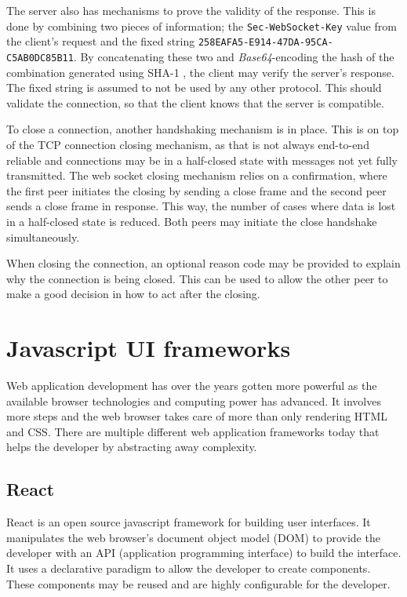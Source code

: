 The server also has mechanisms to prove the validity of the response. This is done by combining two pieces of information; the \texttt{Sec-WebSocket-Key} value from the client's request and the fixed string \texttt{258EAFA5-E914-47DA-95CA-C5AB0DC85B11}. By concatenating these two and \emph{Base64}-encoding \cite{base64} the hash of the combination generated using SHA-1 \cite{RFC3174}, the client may verify the server's response. The fixed string is assumed to not be used by any other protocol. This should validate the connection, so that the client knows that the server is compatible.

To close a connection, another handshaking mechanism is in place. This is on top of the TCP connection closing mechanism, as that is not always end-to-end reliable and connections may be in a half-closed state with messages not yet fully transmitted. \cite[section 4.2.2.13]{RFC1122} The web socket closing mechanism relies on a confirmation, where the first peer initiates the closing by sending a close frame and the second peer sends a close frame in response. This way, the number of cases where data is lost in a half-closed state is reduced. Both peers may initiate the close handshake simultaneously.

When closing the connection, an optional reason code may be provided to explain why the connection is being closed. This can be used to allow the other peer to make a good decision in how to act after the closing.

\section{Javascript UI frameworks}

Web application development has over the years gotten more powerful as the available browser technologies and computing power has advanced. It involves more steps and the web browser takes care of more than only rendering HTML and CSS. There are multiple different web application frameworks today that helps the developer by abstracting away complexity.

\subsection{React}
\label{sub:react}

React is an open source javascript framework for building user interfaces. It manipulates the web browser's document object model (DOM) to provide the developer with an API (application programming interface) to build the interface. It uses a declarative paradigm to allow the developer to create components. \cite{react} These components may be reused and are highly configurable for the developer.

